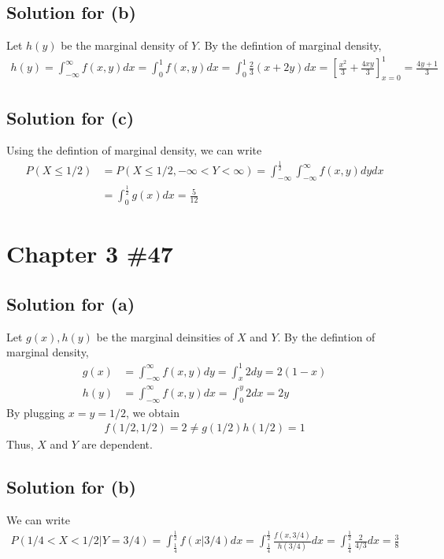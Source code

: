 \documentclass{scrartcl}
\begin{document}
\subsection{Solution for (b)}
Let \(h(y)\) be the marginal density of \(Y\). By the defintion of marginal
density,
\begin{align*}
  h(y)
  = \int^\infty_{-\infty} f(x, y) dx
  = \int^1_0 f(x, y) dx
  = \int^1_0 \frac{2}{3} (x + 2y) dx
  = \left[ \frac{x^2}{3} + \frac{4xy}{3} \right]^1_{x = 0}
  = \frac{4y + 1}{3}
\end{align*}

\subsection{Solution for (c)}
Using the defintion of marginal density, we can write
\begin{align*}
  P(X \leq 1 / 2)
  &= P(X \leq 1 / 2, -\infty < Y < \infty)
  = \int^{\frac{1}{2}}_{-\infty} \int^\infty_{-\infty} f(x, y) dy dx \\
  &= \int^{\frac{1}{2}}_0 g(x) dx = \frac{5}{12}
\end{align*}

\section{Chapter 3 \#47}
\subsection{Solution for (a)}
Let \(g(x), h(y)\) be the marginal deinsities of \(X\) and \(Y\). By the
defintion of marginal density,
\begin{align*}
  g(x)
  &= \int^\infty_{-\infty} f(x, y) dy
  = \int^1_x 2 dy
  = 2(1 - x) \\
  h(y)
  &= \int^\infty_{-\infty} f(x, y) dx
  = \int^y_0 2 dx
  = 2y
\end{align*}
By plugging \(x = y = 1/2\), we obtain
\begin{align*}
  f(1/2, 1/2) = 2 \not = g(1/2) h(1/2) = 1
\end{align*}
Thus, \(X\) and \(Y\) are dependent.

\subsection{Solution for (b)}
We can write
\begin{align*}
  P(1/4 < X < 1/2 | Y = 3/4)
  = \int^\frac{1}{2}_\frac{1}{4} f(x | 3/4) dx
  = \int^\frac{1}{2}_\frac{1}{4} \frac{f(x, 3/4)}{h(3/4)} dx
  = \int^\frac{1}{2}_\frac{1}{4} \frac{2}{4/3} dx
  = \frac{3}{8}
\end{align*}
\end{document}
